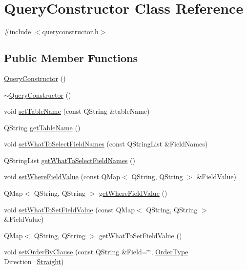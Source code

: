 \hypertarget{class_query_constructor}{}\section{Query\+Constructor Class Reference}
\label{class_query_constructor}


{\ttfamily \#include $<$queryconstructor.\+h$>$}

\subsection*{Public Member Functions}
\begin{DoxyCompactItemize}
\item 
\hyperlink{class_query_constructor_aca25dd3b5f90ea47d12603839f9e5fa1}{Query\+Constructor} ()
\item 
\hyperlink{class_query_constructor_a36ee5259fb3d02aed7001969280d1f41}{$\sim$\+Query\+Constructor} ()
\item 
void \hyperlink{class_query_constructor_ad1b13fbc7d8c55e384c992852f755008}{set\+Table\+Name} (const Q\+String \&table\+Name)
\item 
Q\+String \hyperlink{class_query_constructor_ab15e51c0e2017f03136de1e67d8ba97b}{get\+Table\+Name} ()
\item 
void \hyperlink{class_query_constructor_ae9b5ac08342f01185d0ecc941b882a76}{set\+What\+To\+Select\+Field\+Names} (const Q\+String\+List \&Field\+Names)
\item 
Q\+String\+List \hyperlink{class_query_constructor_af5d3d02ae4bb5cbc734dd857e43e6248}{get\+What\+To\+Select\+Field\+Names} ()
\item 
void \hyperlink{class_query_constructor_a304819b8f851385fa6925cc273ccc94d}{set\+Where\+Field\+Value} (const Q\+Map$<$ Q\+String, Q\+String $>$ \&Field\+Value)
\item 
Q\+Map$<$ Q\+String, Q\+String $>$ \hyperlink{class_query_constructor_a0633e6811dc4b75555dc9519b2df4115}{get\+Where\+Field\+Value} ()
\item 
void \hyperlink{class_query_constructor_a969ca6d0c1d258f8a6e6f587f545c2d2}{set\+What\+To\+Set\+Field\+Value} (const Q\+Map$<$ Q\+String, Q\+String $>$ \&Field\+Value)
\item 
Q\+Map$<$ Q\+String, Q\+String $>$ \hyperlink{class_query_constructor_a9bd4099539666a1c62e8f4eda9b051f1}{get\+What\+To\+Set\+Field\+Value} ()
\item 
void \hyperlink{class_query_constructor_a096ed5c85c40851db92a7f45405df4cd}{set\+Order\+By\+Clause} (const Q\+String \&Field=\char`\"{}\char`\"{}, \hyperlink{queryconstructor_8h_a57124e387290311f33f3b54a54930418}{Order\+Type} Direction=\hyperlink{queryconstructor_8h_a57124e387290311f33f3b54a54930418ada4cdade2120d083fe09b30940e51c12}{Straight})

\end{DoxyCompactItemize}
